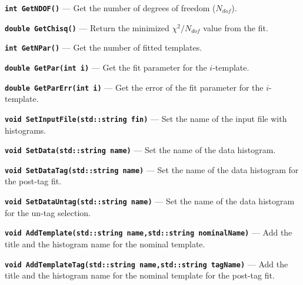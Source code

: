 \documentclass[12pt]{article}
\newcommand\verbbf[1]{\textcolor[rgb]{0,0,1}{\texttt{\textbf{#1}}}}
\begin{document}
\vspace{0.3cm}

\noindent \verbbf{int GetNDOF()} --- Get the number of degrees of freedom
($N_{dof}$).

\vspace{0.3cm}

\noindent \verbbf{double GetChisq()} --- Return the
minimized $\chi^{2}/N_{dof}$ value from the fit.

\vspace{0.3cm}

\noindent \verbbf{int GetNPar()} --- Get the number of fitted templates.

\vspace{0.3cm}

\noindent \verbbf{double GetPar(int i)} --- Get the fit parameter for
the $i$-template.

\vspace{0.3cm}

\noindent \verbbf{double GetParErr(int i)} --- Get the error of the
fit parameter for the $i$-template.

\vspace{0.3cm}

\noindent \verbbf{void SetInputFile(std::string fin)} --- Set the name
of the input file with histograms.

\vspace{0.3cm}

\noindent \verbbf{void SetData(std::string name)} --- Set the name of
the data histogram.

\vspace{0.3cm}

\noindent \verbbf{void SetDataTag(std::string name)} --- Set the name of
the data histogram for the post-tag fit.

\vspace{0.3cm}

\noindent \verbbf{void SetDataUntag(std::string name)} --- Set the name
of the data histogram for the un-tag selection.

\vspace{0.3cm}

\noindent \verbbf{void AddTemplate(std::string name,std::string nominalName)} ---
Add the title and the histogram name for the nominal template.

\vspace{0.3cm}

\noindent \verbbf{void AddTemplateTag(std::string name,std::string tagName)} ---
Add the title and the histogram name for the nominal template for the
post-tag fit.
\end{document}
